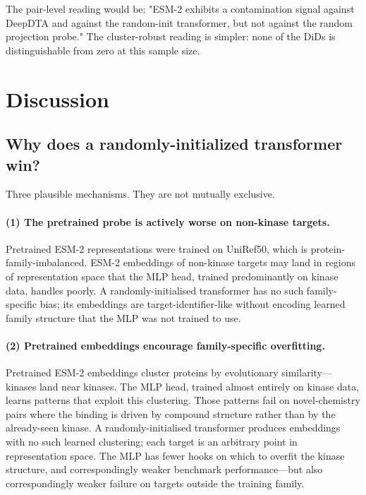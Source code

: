 \documentclass[11pt,a4paper]{article}
\begin{document}
The pair-level reading would be: "ESM-2 exhibits a contamination signal against
DeepDTA and against the random-init transformer, but not against the random
projection probe."
The cluster-robust reading is simpler: none of the DiDs is distinguishable from
zero at this sample size.

\section{Discussion}
\label{sec:discussion}

\subsection{Why does a randomly-initialized transformer win?}

Three plausible mechanisms. They are not mutually exclusive.

\paragraph{(1) The pretrained probe is actively worse on non-kinase targets.}
Pretrained ESM-2 representations were trained on UniRef50, which is
protein-family-imbalanced.
ESM-2 embeddings of non-kinase targets may land in regions of representation
space that the MLP head, trained predominantly on kinase data, handles poorly.
A randomly-initialised transformer has no such family-specific bias; its
embeddings are target-identifier-like without encoding learned family structure
that the MLP was not trained to use.

\paragraph{(2) Pretrained embeddings encourage family-specific overfitting.}
Pretrained ESM-2 embeddings cluster proteins by evolutionary similarity---kinases
land near kinases. The MLP head, trained almost entirely on kinase data, learns
patterns that exploit this clustering. Those patterns fail on novel-chemistry
pairs where the binding is driven by compound structure rather than by the
already-seen kinase. A randomly-initialised transformer produces embeddings
with no such learned clustering; each target is an arbitrary point in
representation space. The MLP has fewer hooks on which to overfit the kinase
structure, and correspondingly weaker benchmark performance---but also
correspondingly weaker failure on targets outside the training family.
\end{document}
